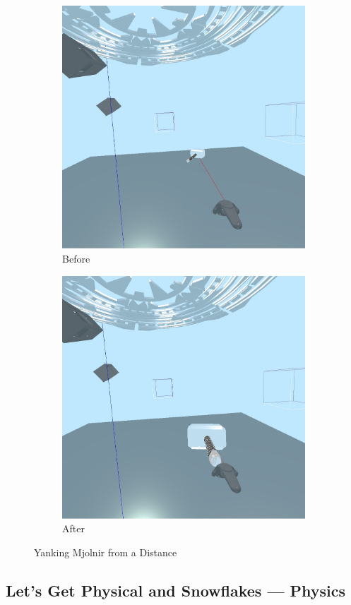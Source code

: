 \documentclass[conference,12pt]{IEEEtran}
\begin{document}
\begin{figure}[H]
    \begin{subfigure}{\linewidth}
        \centering
        \includegraphics[width=0.75\linewidth]{screenshots/yank_a.jpg}
        \caption{Before}
    \end{subfigure}
    \begin{subfigure}{\linewidth}
        \centering
        \includegraphics[width=0.75\linewidth]{screenshots/yank_b.jpg}
        \caption{After}
    \end{subfigure}
    \caption{Yanking Mjolnir from a Distance}
    \label{fig:physics}
\end{figure}

\subsection{Let's Get Physical and Snowflakes --- Physics}
\end{document}
